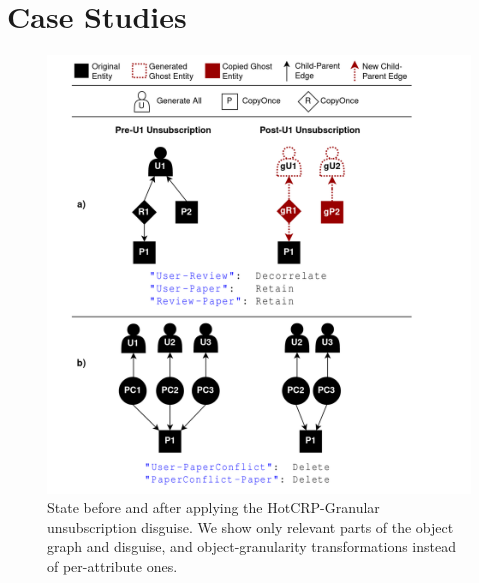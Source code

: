 \section{Case Studies}
\label{sec:hotcrp_example}

\begin{figure}[t!]
    \centering
    \includegraphics[width=.55\textwidth]{img/decor_hotcrp}

    \caption{State before and after applying the HotCRP-Granular unsubscription disguise. We show
    only relevant parts of the object graph and disguise, and object-granularity
    transformations instead of per-attribute ones.\\
    }
    \label{fig:hotcrp}
\end{figure}

